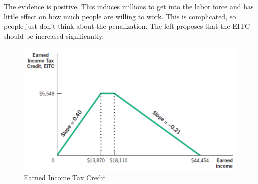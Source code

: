 \documentclass{article}
\begin{document}
The evidence is positive. This induces millions to get into the labor force and
has little effect on how much people are willing to work. This is complicated,
so people just don't think about the penalization. The left proposes that the
EITC should be increased significantly.

\begin{figure}[H]
    \centering
    \includegraphics[scale=0.30]{"Earned Income Tax Credit"}
    \caption{Earned Income Tax Credit}
\end{figure}
\end{document}
